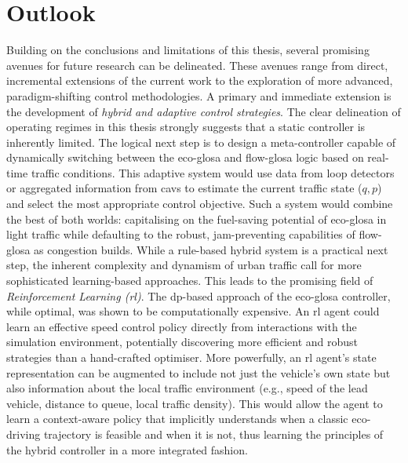 \section{Outlook}
\label{sec:Outlook}

Building on the conclusions and limitations of this thesis, several promising avenues for future research can be delineated. These avenues range from direct, incremental extensions of the current work to the exploration of more advanced, paradigm-shifting control methodologies.
\mynewline
A primary and immediate extension is the development of \textit{hybrid and adaptive control strategies}. The clear delineation of operating regimes in this thesis strongly suggests that a static controller is inherently limited. The logical next step is to design a meta-controller capable of dynamically switching between the \ac{eco-glosa} and \ac{flow-glosa} logic based on real-time traffic conditions. This adaptive system would use data from loop detectors or aggregated information from \acp{cav} to estimate the current traffic state ($q, p$) and select the most appropriate control objective. Such a system would combine the best of both worlds: capitalising on the fuel-saving potential of \ac{eco-glosa} in light traffic while defaulting to the robust, jam-preventing capabilities of \ac{flow-glosa} as congestion builds.
\mynewline
While a rule-based hybrid system is a practical next step, the inherent complexity and dynamism of urban traffic call for more sophisticated learning-based approaches. This leads to the promising field of \textit{Reinforcement Learning (\ac{rl})}. The \ac{dp}-based approach of the \ac{eco-glosa} controller, while optimal, was shown to be computationally expensive. An \ac{rl} agent could learn an effective speed control policy directly from interactions with the simulation environment, potentially discovering more efficient and robust strategies than a hand-crafted optimiser. More powerfully, an \ac{rl} agent's state representation can be augmented to include not just the vehicle's own state but also information about the local traffic environment (e.g., speed of the lead vehicle, distance to queue, local traffic density). This would allow the agent to learn a context-aware policy that implicitly understands when a classic eco-driving trajectory is feasible and when it is not, thus learning the principles of the hybrid controller in a more integrated fashion.
\mynewline
